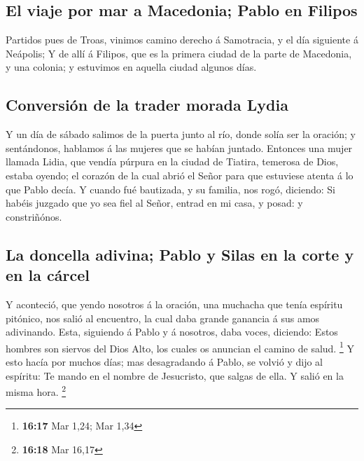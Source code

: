 \hypertarget{el-viaje-por-mar-a-macedonia-pablo-en-filipos}{%
\subsection{El viaje por mar a Macedonia; Pablo en
Filipos}\label{el-viaje-por-mar-a-macedonia-pablo-en-filipos}}

 Partidos pues de Troas, vinimos camino derecho á
Samotracia, y el día siguiente á Neápolis;  Y de allí á
Filipos, que es la primera ciudad de la parte de Macedonia, y una
colonia; y estuvimos en aquella ciudad algunos días.

\hypertarget{conversiuxf3n-de-la-trader-morada-lydia}{%
\subsection{Conversión de la trader morada
Lydia}\label{conversiuxf3n-de-la-trader-morada-lydia}}

 Y un día de sábado salimos de la puerta junto al río,
donde solía ser la oración; y sentándonos, hablamos á las mujeres que se
habían juntado.  Entonces una mujer llamada Lidia, que
vendía púrpura en la ciudad de Tiatira, temerosa de Dios, estaba oyendo;
el corazón de la cual abrió el Señor para que estuviese atenta á lo que
Pablo decía.  Y cuando fué bautizada, y su familia, nos
rogó, diciendo: Si habéis juzgado que yo sea fiel al Señor, entrad en mi
casa, y posad: y constriñónos.

\hypertarget{la-doncella-adivina-pablo-y-silas-en-la-corte-y-en-la-cuxe1rcel}{%
\subsection{La doncella adivina; Pablo y Silas en la corte y en la
cárcel}\label{la-doncella-adivina-pablo-y-silas-en-la-corte-y-en-la-cuxe1rcel}}

 Y aconteció, que yendo nosotros á la oración, una muchacha
que tenía espíritu pitónico, nos salió al encuentro, la cual daba grande
ganancia á sus amos adivinando.  Esta, siguiendo á Pablo y
á nosotros, daba voces, diciendo: Estos hombres son siervos del Dios
Alto, los cuales os anuncian el camino de salud. \footnote{\textbf{16:17}
  Mar 1,24; Mar 1,34}  Y esto hacía por muchos días; mas
desagradando á Pablo, se volvió y dijo al espíritu: Te mando en el
nombre de Jesucristo, que salgas de ella. Y salió en la misma hora.
\footnote{\textbf{16:18} Mar 16,17}

